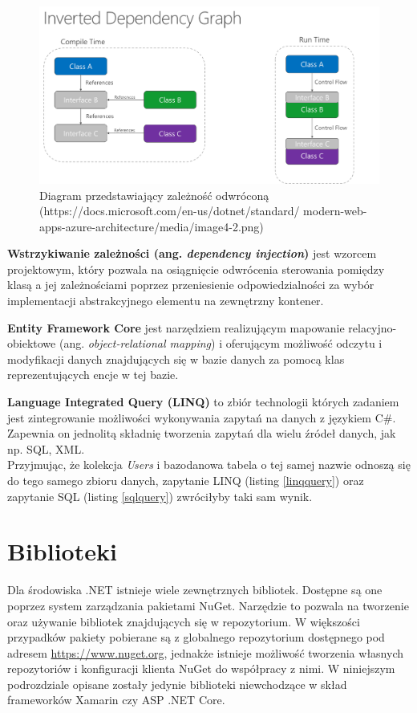 \begin{figure}[!ht]
	\begin{center}
		\includegraphics[width=6in]{img/diagram/inverted_dependency.png}
		\caption{Diagram przedstawiający zależność odwróconą (https://docs.microsoft.com/en-us/dotnet/standard/ modern-web-apps-azure-architecture/media/image4-2.png)}
		\label{inverted_dependency}
	\end{center}
\end{figure}
\textbf{Wstrzykiwanie zależności (ang. \textit{dependency injection})} jest wzorcem projektowym, który pozwala na osiągnięcie odwrócenia sterowania pomiędzy klasą a jej zależnościami poprzez przeniesienie odpowiedzialności za wybór implementacji abstrakcyjnego elementu na zewnętrzny kontener.\cite{dependencyinjection}

\textbf{Entity Framework Core} jest narzędziem realizującym mapowanie relacyjno-obiektowe (ang. \textit{object-relational mapping}) i oferującym możliwość odczytu i modyfikacji danych znajdujących się w bazie danych za pomocą klas reprezentujących encje w tej bazie.\cite{efcore}

\textbf{Language Integrated Query (LINQ)} to zbiór technologii których zadaniem jest zintegrowanie możliwości wykonywania zapytań na danych z językiem C\#. Zapewnia on jednolitą składnię tworzenia zapytań dla wielu źródeł danych, jak np. SQL, XML.\cite{linq}\\
Przyjmując, że kolekcja \textit{Users} i bazodanowa tabela o tej samej nazwie odnoszą się do tego samego zbioru danych, zapytanie LINQ (listing \ref{linqquery}) oraz zapytanie SQL (listing \ref{sqlquery}) zwróciłyby taki sam wynik.


\section{Biblioteki}
Dla środowiska .NET istnieje wiele zewnętrznych bibliotek. Dostępne są one poprzez system zarządzania pakietami NuGet. Narzędzie to pozwala na tworzenie oraz używanie bibliotek znajdujących się w repozytorium. W większości przypadków pakiety pobierane są z globalnego repozytorium dostępnego pod adresem \url{https://www.nuget.org}, jednakże istnieje możliwość tworzenia własnych repozytoriów i konfiguracji klienta NuGet do współpracy z nimi. W niniejszym podrozdziale opisane zostały jedynie biblioteki niewchodzące w skład frameworków Xamarin czy ASP .NET Core.

